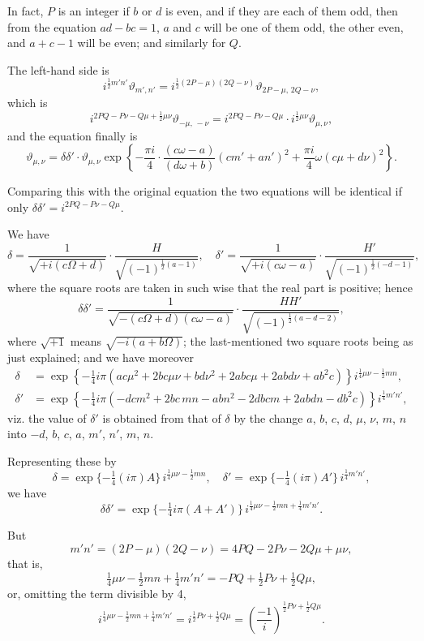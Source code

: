 \documentclass[11pt,a4paper]{book}
\begin{document}
In fact, $P$ is an integer if $b$ or $d$ is even, and if they are each of them odd, then from the equation $ad - bc = 1$, $a$ and $c$ will be one of them odd, the other even, and $a + c - 1$ will be even; and similarly for $Q$.

The left-hand side is
\[
i^{\frac{1}{2}m'n'}\vartheta_{m',n'} = i^{\frac{1}{2}(2P-\mu)(2Q-\nu)}\vartheta_{2P-\mu,\,2Q-\nu},
\]
which is
\[
i^{2PQ - P\nu - Q\mu + \frac{1}{2}\mu\nu}\vartheta_{-\mu,\,-\nu} = i^{2PQ - P\nu - Q\mu} \cdot i^{\frac{1}{2}\mu\nu}\vartheta_{\mu,\nu},
\]
and the equation finally is
\[
\vartheta_{\mu,\nu} = \delta\delta' \cdot \vartheta_{\mu,\nu} \exp\left\{-\frac{\pi i}{4}\cdot\frac{(c\omega - a)}{(d\omega + b)}(cm' + an')^2 + \frac{\pi i}{4}\omega(c\mu + d\nu)^2\right\}.
\]

Comparing this with the original equation the two equations will be identical if only $\delta\delta' = i^{2PQ - P\nu - Q\mu}$.

We have
\[
\delta = \frac{1}{\sqrt{+i(c\Omega + d)}} \cdot \frac{H}{\sqrt{(-1)^{\frac{1}{2}(a-1)}}}, \quad \delta' = \frac{1}{\sqrt{+i(c\omega - a)}} \cdot \frac{H'}{\sqrt{(-1)^{\frac{1}{2}(-d-1)}}},
\]
where the square roots are taken in such wise that the real part is positive; hence
\[
\delta\delta' = \frac{1}{\sqrt{-(c\Omega + d)(c\omega - a)}} \cdot \frac{HH'}{\sqrt{(-1)^{\frac{1}{2}(a-d-2)}}},
\]
where $\sqrt{+1}$ means $\sqrt{-i(a + b\Omega)}$; the last-mentioned two square roots being as just explained; and we have moreover
\begin{align*}
\delta &= \exp\left\{-\tfrac{1}{4}i\pi(ac\mu^2 + 2bc\mu\nu + bd\nu^2 + 2abc\mu + 2abd\nu + ab^2c)\right\}i^{\frac{1}{4}\mu\nu - \frac{1}{2}mn},\\
\delta' &= \exp\left\{-\tfrac{1}{4}i\pi(-dc m^2 + 2bc\,mn - ab n^2 - 2dbcm + 2abdn - db^2c)\right\}i^{\frac{1}{4}m'n'},
\end{align*}
viz. the value of $\delta'$ is obtained from that of $\delta$ by the change $a$, $b$, $c$, $d$, $\mu$, $\nu$, $m$, $n$ into $-d$, $b$, $c$, $a$, $m'$, $n'$, $m$, $n$.

Representing these by
\[
\delta = \exp\{-\tfrac{1}{4}(i\pi)A\}\,i^{\frac{1}{4}\mu\nu - \frac{1}{2}mn}, \quad \delta' = \exp\{-\tfrac{1}{4}(i\pi)A'\}\,i^{\frac{1}{4}m'n'},
\]
we have
\[
\delta\delta' = \exp\{-\tfrac{1}{4}i\pi(A + A')\}\,i^{\frac{1}{4}\mu\nu - \frac{1}{2}mn + \frac{1}{4}m'n'}.
\]

But
\[
m'n' = (2P - \mu)(2Q - \nu) = 4PQ - 2P\nu - 2Q\mu + \mu\nu,
\]
that is,
\[
\tfrac{1}{4}\mu\nu - \tfrac{1}{2}mn + \tfrac{1}{4}m'n' = -PQ + \tfrac{1}{2}P\nu + \tfrac{1}{2}Q\mu,
\]
or, omitting the term divisible by 4,
\[
i^{\frac{1}{4}\mu\nu - \frac{1}{2}mn + \frac{1}{4}m'n'} = i^{\frac{1}{2}P\nu + \frac{1}{2}Q\mu} = \left(\frac{-1}{i}\right)^{\frac{1}{2}P\nu + \frac{1}{2}Q\mu}.
\]
\end{document}
